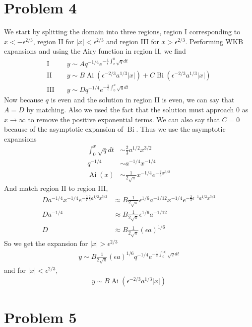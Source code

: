\documentclass[12pt]{article}
\newcommand{\eq}[1]{\begin{align*}#1\end{align*}}
\newcommand{\Ai}{\operatorname{Ai}}
\newcommand{\Bi}{\operatorname{Bi}}
\begin{document}
\section*{Problem 4} We start by splitting the domain into three regions, region I corresponding to $x < -\epsilon^{2/3}$, region II for $|x| < \epsilon^{2/3}$ and region III for $x > \epsilon^{2/3}$. Performing WKB expansions and using the Airy function in region II, we find
\eq{
	\text{I}\quad& y \sim A q^{-1/4} e^{-\frac{1}{\epsilon}\int_x^0 \sqrt{q} dt}\\
	\text{II}\quad& y \sim B \Ai(\epsilon^{-2/3} a^{1/3} |x|) + C \Bi(\epsilon^{-2/3} a^{1/3} |x|)\\
	\text{III}\quad& y \sim D q^{-1/4} e^{-\frac{1}{\epsilon}\int_0^x \sqrt{q} dt}
}
Now because $q$ is even and the solution in region II is even, we can say that $A = D$ by matching. Also we used the fact that the solution must approach 0 as $x \rightarrow \infty$ to remove the positive exponential terms. We can also say that $C = 0$ because of the asymptotic expansion of $\Bi$. Thus we use the asymptotic expansions
\eq{
	\int_0^x \sqrt{q} dt &\sim \frac{2}{3}a^{1/2}x^{3/2}\\
	q^{-1/4} &\sim a^{-1/4}x^{-1/4}\\
	\Ai(x) &\sim \frac{1}{2\sqrt{\pi}} x^{-1/4}e^{-\frac{2}{3}x^{3/2}}
}
And match region II to region III,
\eq{
	Da^{-1/4}x^{-1/4}e^{-\frac{1}{\epsilon} \frac{2}{3} a^{1/2} x^{3/2}} &\approx B\frac{1}{2\sqrt{\pi}} \epsilon^{1/6}a^{-1/12}x^{-1/4}e^{-\frac{2}{3} \epsilon^{-1} a^{1/2} x^{3/2}}\\
	Da^{-1/4}&\approx B\frac{1}{2\sqrt{\pi}} \epsilon^{1/6}a^{-1/12}\\
	D &\approx B\frac{1}{2\sqrt{\pi}} (\epsilon a)^{1/6}
}
So we get the expansion for $|x| > \epsilon^{2/3}$
\eq{
	y \sim B\frac{1}{2\sqrt{\pi}} (\epsilon a)^{1/6} q^{-1/4} e^{-\frac{1}{\epsilon}\int_0^{|x|} \sqrt{q} dt}
}
and for $|x| < \epsilon^{2/3}$,
\eq{
	y \sim B \Ai(\epsilon^{-2/3} a^{1/3} |x|)
}
\section*{Problem 5}
\end{document}
